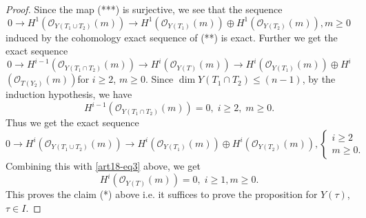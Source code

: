 \begin{proof}
Since the map (***) is surjective, we see that the sequence
\begin{equation*}
0 \to H^1 (\mathscr{O}_{Y (T_1 \cup T_2)}(m)) \to H^1 (\mathscr{O}_{Y(T_1)} (m)) \oplus H^1 (\mathscr{O}_{Y(T_2)} (m)), m \geqslant 0 \tag*{(3)}\label{art18-eq3}
\end{equation*}
induced by the cohomology exact sequence of (**) is exact. Further we get the exact sequence
$$
0 \to H^{i-1} (\mathscr{O}_{Y (T_1 \cap T_2)}(m)) \to H^i (\mathscr{O}_{Y(T)} (m)) \to H^i (\mathscr{O}_{Y(T_1)}(m)) \oplus H^i
$$
$(\mathscr{O}_{T(Y_2)}(m))$\pageoriginale for $i \geqslant 2$, $m \geqslant 0$. Since $\dim Y(T_1 \cap T_2) \leqslant (n-1)$, by the induction hypothesis, we have
$$
H^{i-1} (\mathscr{O}_{Y(T_1 \cap T_2)} (m)) =0, \; i \geqslant 2, \; m \geqslant 0.
$$ 
Thus we get the exact sequence
\begin{equation*} 
0 \to H^i (\mathscr{O}_{Y (T_1 \cup T_2)}(m)) \to H^i (\mathscr{O}_{Y(T_1)}(m)) \oplus H^i (\mathscr{O}_{Y(T_2)} (m)), 
\begin{cases}
i \geqslant 2\\
m \geqslant 0.
\end{cases}
\end{equation*} 
Combining this with \ref{art18-eq3} above, we get
$$
H^i (\mathscr{O}_{Y(T)}(m))= 0, \; i \geqslant 1, m \geqslant 0.
$$
This proves the claim (*) above i.e. it suffices to prove the proposition for $Y(\tau)$, $\tau\in I$.


\end{proof}

